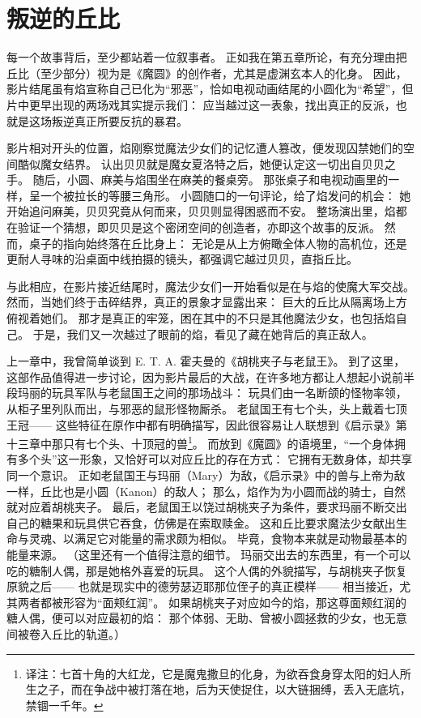 \chapter{叛逆的丘比}
每一个故事背后，至少都站着一位叙事者。
正如我在第五章所论，有充分理由把丘比（至少部分）视为是《魔圆》的创作者，尤其是虚渊玄本人的化身。
因此，影片结尾虽有焰宣称自己已化为“邪恶”，恰如电视动画结尾的小圆化为“希望”，但片中更早出现的两场戏其实提示我们：
应当越过这一表象，找出真正的反派，也就是这场叛逆真正所要反抗的暴君。

影片相对开头的位置，焰刚察觉魔法少女们的记忆遭人篡改，便发现囚禁她们的空间酷似魔女结界。
认出贝贝就是魔女夏洛特之后，她便认定这一切出自贝贝之手。
随后，小圆、麻美与焰围坐在麻美的餐桌旁。
那张桌子和电视动画里的一样，呈一个被拉长的等腰三角形。
小圆随口的一句评论，给了焰发问的机会：
她开始追问麻美，贝贝究竟从何而来，贝贝则显得困惑而不安。
整场演出里，焰都在验证一个猜想，即贝贝是这个密闭空间的创造者，亦即这个故事的反派。
然而，桌子的指向始终落在丘比身上：
无论是从上方俯瞰全体人物的高机位，还是更耐人寻味的沿桌面中线拍摄的镜头，都强调它越过贝贝，直指丘比。

与此相应，在影片接近结尾时，魔法少女们一开始看似是在与焰的使魔大军交战。
然而，当她们终于击碎结界，真正的景象才显露出来：
巨大的丘比从隔离场上方俯视着她们。
那才是真正的牢笼，困在其中的不只是其他魔法少女，也包括焰自己。
于是，我们又一次越过了眼前的焰，看见了藏在她背后的真正敌人。

上一章中，我曾简单谈到 E. T. A. 霍夫曼的《胡桃夹子与老鼠王》。
到了这里，这部作品值得进一步讨论，因为影片最后的大战，在许多地方都让人想起小说前半段玛丽的玩具军队与老鼠国王之间的那场战斗：
玩具们由一名断颌的怪物率领，从柜子里列队而出，与邪恶的鼠形怪物厮杀。
老鼠国王有七个头，头上戴着七顶王冠——
这些特征在原作中都有明确描写，因此很容易让人联想到《启示录》第十三章中那只有七个头、十顶冠的兽\footnote{%
    译注：七首十角的大红龙，它是魔鬼撒旦的化身，为欲吞食身穿太阳的妇人所生之子，而在争战中被打落在地，后为天使捉住，以大链捆缚，丢入无底坑，禁锢一千年。
}。
而放到《魔圆》的语境里，“一个身体拥有多个头”这一形象，又恰好可以对应丘比的存在方式：
它拥有无数身体，却共享同一个意识。
正如老鼠国王与玛丽（Mary）为敌，《启示录》中的兽与上帝为敌一样，丘比也是小圆（Kanon）的敌人；
那么，焰作为为小圆而战的骑士，自然就对应着胡桃夹子。
最后，老鼠国王以饶过胡桃夹子为条件，要求玛丽不断交出自己的糖果和玩具供它吞食，仿佛是在索取赎金。
这和丘比要求魔法少女献出生命与灵魂、以满足它对能量的需求颇为相似。
毕竟，食物本来就是动物最基本的能量来源。
（这里还有一个值得注意的细节。
玛丽交出去的东西里，有一个可以吃的糖制人偶，那是她格外喜爱的玩具。
这个人偶的外貌描写，与胡桃夹子恢复原貌之后——
也就是现实中的德劳瑟迈耶那位侄子的真正模样——
相当接近，尤其两者都被形容为“面颊红润”。
如果胡桃夹子对应如今的焰，那这尊面颊红润的糖人偶，便可以对应最初的焰：
那个体弱、无助、曾被小圆拯救的少女，也无意间被卷入丘比的轨道。）

